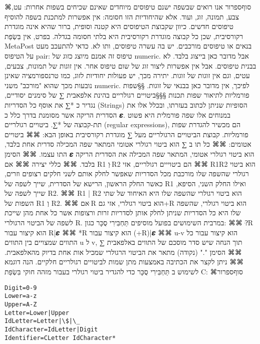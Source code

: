   ⌘סוף{ספרור}
      אנו רואים שבשפה ישנם טיפוסים מיוחדים שאינם שכיחים בשפות אחרות: עט, צבע,
      תמונה, זוג, ועוד. אלא שהיחודיות הזו חסומה: אין אפשרות למתכנת בשפה להוסיף
      טיפוסים חדשים. כיוון שקבוצת הטיפוסים היא קטנה וסופית, ברור שהיא אינה
      מוגדרת רקורסיבית, שכן כל קבוצה מוגדרת רקורסיבית היא בלתי חסומה בגדלה.
      בפרט, אין בִּשְׂפַת MetaPost בנאים או טיפוסים מורכבים. יש בה עשרה טיפוסים, ותו
      לא. כדאי להתעכב מעט על הטיפוס pair: טיפוס זה אמנם מיוצג כזוג של numeric.
      אבל מדובר כאן בייצוג בלבד. לא בבנית טיפוסים. אבל אין אפשרות ליצור זוג של
      שום טיפוס אחר. אין זוגות של תמונות, צבעים, עטים, וגם אין זוגות של זוגות.
      יתירה מכך, יש פעולות יחודיות לזוג, כמו טרנספורמציה שאינן נובעות מכך שהוא
      "מורכב" משני numeric. לפיכך, אין מדובר כאן בבנאי של זוגות.
      §§שפות פורמליות לתיאור שפות תכנות
      §§§ביטויים רגולריים
      בהינת אלפאבית ∑ של סימנים יסודיים, נגדיר כ *∑ את אוסף כל הסדריות (Strings) הסופיות שניתן לכתוב בעזרתו, ובכלל אלו את הסדרית הריקה אשר מסומנת בדרך כלל כ 𝜺. במנוחים אלו שפה פורמלית היא פשוט תת-קבוצה של *∑. ביטויים רגולריים (regular expressions), הם מכשיר להגדרת שפות פורמליות.
      קבוצת הביטויים הרגולריים מעל ∑ מוגדרת רקורסיבית באופן הבא:
      ⌘⌘ ביטויים אטומים:
      ⌘⌘ כל תו ב ∑ הוא ביטוי רגולרי אטומי המתאר שפה המכילה סדרית אחת בלבד, התו עצמו.
      ⌘⌘ הסימן 𝜺 הוא ביטוי רגולרי אטומי, המתאר שפה המכילה את הסדרית הריקה בלבד.
      ⌘⌘ כללי יצירה
      ⌘⌘ אם R1 וְ ּR2 הם ביטוייים רגולריים, אזי
      ⌘⌘ R1R2 הוא ביטוי רגולרי שהשפה שלו מורכבת מכל הסדריות שאפשר לחלק אותם לשני חלקים רצופים וזרים, כאשר החלק הראשון, הרישא של הסדרית, שייך לשפה של R1 ואילו החלק השני, הסיפא, שייך לשפה של R2.
      ⌘⌘ R1 | R2 הוא ביטוי רגולרי שהשפה שלו היא האיחוד של שתי השפות של R1 וְ R2.
      ⌘⌘ אם ּR הוא ביטוי רגולרי, אזי גם+R הוא ביטוי רגולרי, שהשפה שלו היא כל הסדריות שניתן לחלק אותן לסדריות זרות ורצופות אשר כל אחת מהן שייכת לשפה של הביטוי הרגולרי R.
      במרבית השימושים בפועל מוסיפים תַּחְבִּירִי סֻכָּר כגון:
      ⌘⌘ ?ּR הוא קיצור עבור R|𝜺
      ⌘⌘ *R הוא קיצור עבור (+R)|𝜺
      ⌘⌘ u-v הוא קיצור עבור כל התווים שמצויים בין התווים u ל v, תוך הנחה שיש סדר מוסכם של התווים באלפאבית ∑
      ⌘⌘ הסימן "." (נקודה) מתאר את הביטוי הרגולרי שמכיל אות אחת בדיוק מהאלפאבית.
      ⌘⌘ ניתן לקצר את הכתיבה באמצעות מתן שמות לביטויים רגולריים חלקיים.
      הנה דוגמא לשימוש ב תַּחְבִּירִי סֻכָּר כדי להגדיר ביטוי רגולרי בעבור מזהה חוקי בִּשְׂפַת C:
  ⌘סוף{ספרור}
\begin{verbatim}
Digit=0-9
Lower=a-z
Upper=A-Z
Letter=Lower|Upper
IdLetter=Letter|\$|\_
IdCharacter=IdLetter|Digit
Identifier=CLetter IdCharacter*
\end{verbatim}

